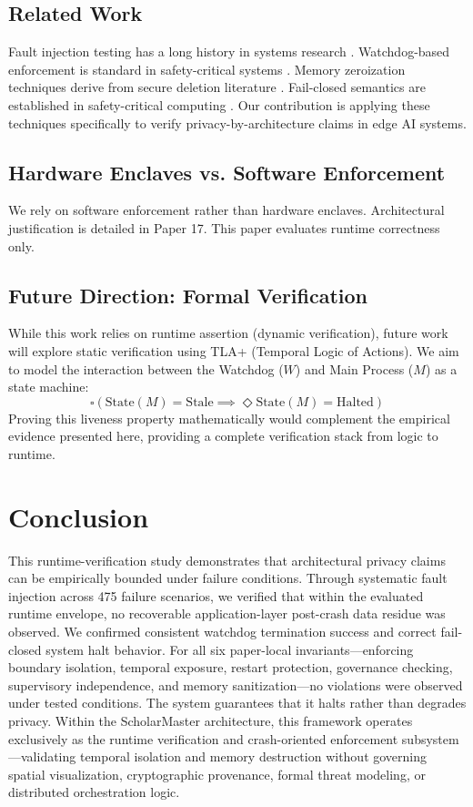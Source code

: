 \documentclass[conference]{IEEEtran}
\begin{document}
\subsection{Related Work}
Fault injection testing has a long history in systems research \cite{b1, b2}. Watchdog-based enforcement is standard in safety-critical systems \cite{b3}. Memory zeroization techniques derive from secure deletion literature \cite{b4}. Fail-closed semantics are established in safety-critical computing \cite{b5}. Our contribution is applying these techniques specifically to verify privacy-by-architecture claims in edge AI systems.

\subsection{Hardware Enclaves vs. Software Enforcement}
We rely on software enforcement rather than hardware enclaves. Architectural justification is detailed in Paper 17. This paper evaluates runtime correctness only.

\subsection{Future Direction: Formal Verification}
While this work relies on runtime assertion (dynamic verification), future work will explore static verification using TLA+ (Temporal Logic of Actions). We aim to model the interaction between the Watchdog ($W$) and Main Process ($M$) as a state machine:
\begin{equation}
\square (\text{State}(M) = \text{Stale} \implies \Diamond \text{State}(M) = \text{Halted})
\end{equation}
Proving this liveness property mathematically would complement the empirical evidence presented here, providing a complete verification stack from logic to runtime.

\section{Conclusion}

This runtime-verification study demonstrates that architectural privacy claims can be empirically bounded under failure conditions. Through systematic fault injection across 475 failure scenarios, we verified that within the evaluated runtime envelope, no recoverable application-layer post-crash data residue was observed. We confirmed consistent watchdog termination success and correct fail-closed system halt behavior. For all six paper-local invariants---enforcing boundary isolation, temporal exposure, restart protection, governance checking, supervisory independence, and memory sanitization---no violations were observed under tested conditions. The system guarantees that it halts rather than degrades privacy. Within the ScholarMaster architecture, this framework operates exclusively as the runtime verification and crash-oriented enforcement subsystem---validating temporal isolation and memory destruction without governing spatial visualization, cryptographic provenance, formal threat modeling, or distributed orchestration logic.
\end{document}
